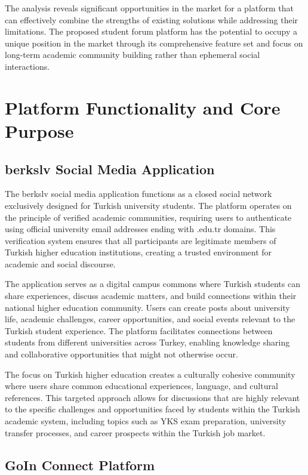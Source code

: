 The analysis reveals significant opportunities in the market for a platform that can effectively combine the strengths of existing solutions while addressing their limitations. The proposed student forum platform has the potential to occupy a unique position in the market through its comprehensive feature set and focus on long-term academic community building rather than ephemeral social interactions.

\section{Platform Functionality and Core Purpose}

\subsection{berkslv Social Media Application}

The berkslv \cite{berkslv-social-app} social media application functions as a closed social network exclusively designed for Turkish university students. The platform operates on the principle of verified academic communities, requiring users to authenticate using official university email addresses ending with .edu.tr domains. This verification system ensures that all participants are legitimate members of Turkish higher education institutions, creating a trusted environment for academic and social discourse.

The application serves as a digital campus commons where Turkish students can share experiences, discuss academic matters, and build connections within their national higher education community. Users can create posts about university life, academic challenges, career opportunities, and social events relevant to the Turkish student experience. The platform facilitates connections between students from different universities across Turkey, enabling knowledge sharing and collaborative opportunities that might not otherwise occur.

The focus on Turkish higher education creates a culturally cohesive community where users share common educational experiences, language, and cultural references. This targeted approach allows for discussions that are highly relevant to the specific challenges and opportunities faced by students within the Turkish academic system, including topics such as YKS exam preparation, university transfer processes, and career prospects within the Turkish job market.

\subsection{GoIn Connect Platform}

